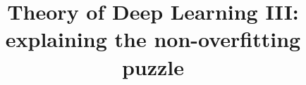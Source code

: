 \documentclass[10pt]{article}
\title{Theory of Deep  Learning III: 
explaining the non-overfitting puzzle}
\author {Tomaso Poggio$^{\dagger, \ast}$, Kenji  Kawaguchi
  $^{\dagger \top}$, Qianli Liao$^{\dagger}$,
  Brando Miranda$^\dagger$,  Lorenzo Rosasco$^\dagger$\\
{\it with}\\Xavier Boix$^\dagger$,  Jack Hidary$^{\dagger \dagger}$,
Hrushikesh Mhaskar$^{\diamond}$,\\
\\
  \author
  \normalsize{$^\dagger$Center for Brains, Minds and Machines, MIT}\\
  \normalsize{$^{\dagger \top}$CSAIL, MIT}\\
  \normalsize{$^{\dagger \dagger}$GoogleX}\\
  \normalsize{$^{\top \top}$IIT}\\
  \normalsize{$^{\diamond}$Claremont Graduate
University}\\
 \normalsize{$^\ast$To whom correspondence should be addressed; E-mail:
  tp@ai.mit.edu} 
}
\date{}
\begin{document}


\def\memonumber{073}
\def\memodate{\today}
\def\memotitle {Theory of Deep  Learning III:  explaining the non-overfitting puzzle}
\def\memoauthors{
  T. Poggio$^{\dagger}$, K. Kawaguchi $^{\dagger \top}$, Q. Liao$^{\dagger}$,  B. Miranda$^\dagger$,  L. Rosasco$^\dagger$\\   
   {\it with} \\
   X. Boix$^\dagger$,  J. Hidary$^{\dagger \dagger}$,  H. Mhaskar$^{\diamond}$,\\
  \small{$^\dagger$Center for Brains, Minds and Machines, MIT}\\
  \small{$^{\top}$CSAIL, MIT}\\
  \small{$^{\dagger \dagger}$Alphabet (Google) X}\\
  \small{$^{\diamond}$Claremont Graduate University}\\  

}
\end{document}
